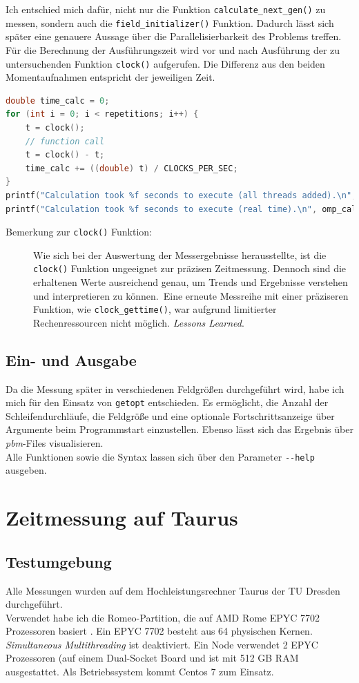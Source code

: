 \documentclass[german,plainarticle,hyperref,utf8]{zihpub}
\begin{document}
	Ich entschied mich dafür, nicht nur die Funktion \texttt{calculate\_next\_gen()} zu messen, sondern auch die \texttt{field\_initializer()} Funktion. Dadurch lässt sich später eine genauere Aussage über die Parallelisierbarkeit des Problems treffen. Für die Berechnung der Ausführungszeit wird vor und nach Ausführung der zu untersuchenden Funktion \texttt{clock()} aufgerufen. Die Differenz aus den beiden Momentaufnahmen entspricht der jeweiligen Zeit.\\
	\begin{lstlisting}[language=C, caption=Berechnung der Ausführungszeit eines \textit{function calls}]
double time_calc = 0;
for (int i = 0; i < repetitions; i++) {
	t = clock();
	// function call
	t = clock() - t;
	time_calc += ((double) t) / CLOCKS_PER_SEC;
}
printf("Calculation took %f seconds to execute (all threads added).\n", time_calc);
printf("Calculation took %f seconds to execute (real time).\n", omp_calc);
\end{lstlisting}
	\begin{description}
		\item[Bemerkung zur \texttt{clock()} Funktion:] Wie sich bei der Auswertung der Messergebnisse herausstellte, ist die \texttt{clock()} Funktion ungeeignet zur präzisen Zeitmessung. Dennoch sind die erhaltenen Werte ausreichend genau, um Trends und Ergebnisse verstehen und interpretieren zu können.\
		Eine erneute Messreihe mit einer präziseren Funktion, wie \texttt{clock\_gettime()}, war aufgrund limitierter Rechenressourcen nicht möglich. \textit{Lessons Learned}.
	\end{description}
	
	\subsection{Ein- und Ausgabe}
	Da die Messung später in verschiedenen Feldgrößen durchgeführt wird, habe ich mich für den Einsatz von \verb|getopt| entschieden. Es ermöglicht, die Anzahl der Schleifendurchläufe, die Feldgröße und eine optionale Fortschrittsanzeige über Argumente beim Programmstart einzustellen.
	Ebenso lässt sich das Ergebnis über \textit{pbm}-Files visualisieren.\\
	Alle Funktionen sowie die Syntax lassen sich über den Parameter \texttt{-{}-help} ausgeben.
	\newpage
	\section{Zeitmessung auf Taurus}
	\subsection{Testumgebung} \label{umgebung}
	Alle Messungen wurden auf dem Hochleistungsrechner Taurus der TU Dresden durchgeführt.\\
	Verwendet habe ich die Romeo-Partition, die auf AMD Rome EPYC 7702 Prozessoren basiert \cite{hpc}. Ein EPYC 7702 besteht aus 64 physischen Kernen. \textit{Simultaneous Multithreading} ist deaktiviert. Ein Node verwendet 2 EPYC Prozessoren (auf einem Dual-Socket Board und ist mit 512 GB RAM ausgestattet. Als Betriebssystem kommt Centos 7 zum Einsatz.\\
	
\end{document}
